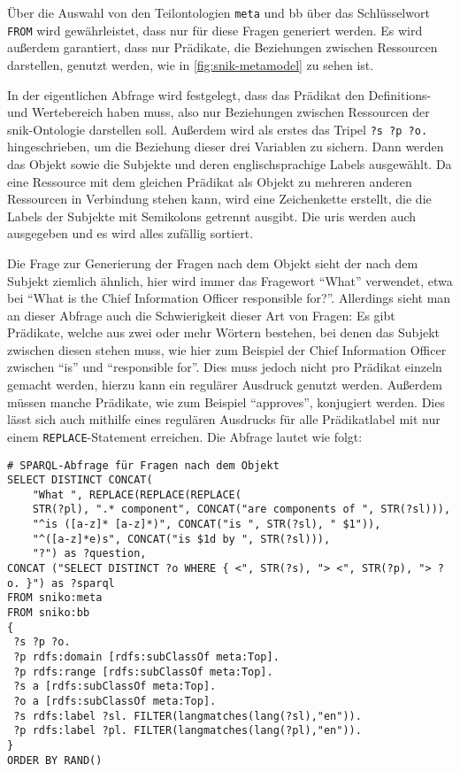 Über die Auswahl von den Teilontologien \texttt{meta} und {bb} über das Schlüsselwort \texttt{FROM} wird gewährleistet, dass nur für diese Fragen generiert werden.
Es wird außerdem garantiert, dass nur Prädikate, die Beziehungen zwischen Ressourcen darstellen, genutzt werden, wie in \cref{fig:snik-metamodel} zu sehen ist.

In der eigentlichen Abfrage wird festgelegt, dass das Prädikat den Definitions- und Wertebereich   haben muss, also nur Beziehungen zwischen Ressourcen der \ac{snik}-Ontologie darstellen soll.
Außerdem wird als erstes das Tripel \texttt{?s ?p ?o.} hingeschrieben, um die Beziehung dieser drei Variablen zu sichern.
Dann werden das Objekt sowie die Subjekte und deren englischsprachige Labels ausgewählt.
Da eine Ressource mit dem gleichen Prädikat als Objekt zu mehreren anderen Ressourcen in Verbindung stehen kann, wird eine Zeichenkette erstellt, die die Labels der Subjekte mit Semikolons getrennt ausgibt.
Die \acp{uri} werden auch ausgegeben und es wird alles zufällig sortiert.

Die Frage zur Generierung der Fragen nach dem Objekt sieht der nach dem Subjekt ziemlich ähnlich, hier wird immer das Fragewort \enquote{What} verwendet, etwa bei \enquote{What is the Chief Information Officer responsible for?}.
Allerdings sieht man an dieser Abfrage auch die Schwierigkeit dieser Art von Fragen:
Es gibt Prädikate, welche aus zwei oder mehr Wörtern bestehen, bei denen das Subjekt zwischen diesen stehen muss, wie hier zum Beispiel der Chief Information Officer zwischen \enquote{is} und \enquote{responsible for}.
Dies muss jedoch nicht pro Prädikat einzeln gemacht werden, hierzu kann ein regulärer Ausdruck genutzt werden.
Außerdem müssen manche Prädikate, wie zum Beispiel \enquote{approves}, konjugiert werden.
Dies lässt sich auch mithilfe eines regulären Ausdrucks für alle Prädikatlabel mit nur einem \texttt{REPLACE}-Statement erreichen.
Die Abfrage lautet wie folgt:
\begin{lstlisting}[language=SPARQL]
# SPARQL-Abfrage für Fragen nach dem Objekt
SELECT DISTINCT CONCAT(
    "What ", REPLACE(REPLACE(REPLACE(
    STR(?pl), ".* component", CONCAT("are components of ", STR(?sl))),
    "^is ([a-z]* [a-z]*)", CONCAT("is ", STR(?sl), " $1")),
    "^([a-z]*e)s", CONCAT("is $1d by ", STR(?sl))),
    "?") as ?question,
CONCAT ("SELECT DISTINCT ?o WHERE { <", STR(?s), "> <", STR(?p), "> ?o. }") as ?sparql
FROM sniko:meta
FROM sniko:bb
{
 ?s ?p ?o.
 ?p rdfs:domain [rdfs:subClassOf meta:Top].
 ?p rdfs:range [rdfs:subClassOf meta:Top].
 ?s a [rdfs:subClassOf meta:Top].
 ?o a [rdfs:subClassOf meta:Top].
 ?s rdfs:label ?sl. FILTER(langmatches(lang(?sl),"en")).
 ?p rdfs:label ?pl. FILTER(langmatches(lang(?pl),"en")).
}
ORDER BY RAND()
\end{lstlisting}

